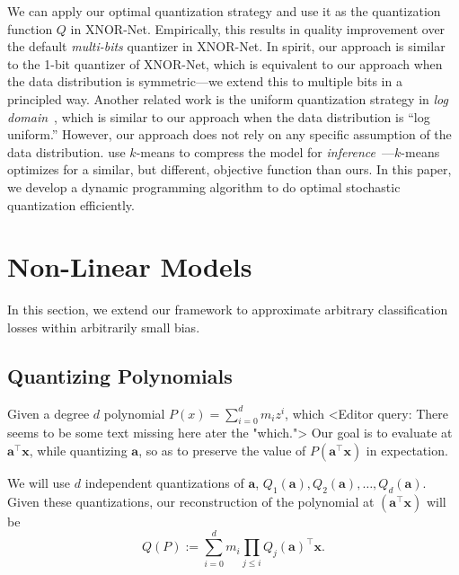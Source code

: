 \documentclass{article}
\renewcommand{\vec}[1]{\mathbf{#1}}
\begin{document}
We can apply our optimal quantization strategy 
and use it as the quantization function $Q$
in XNOR-Net. Empirically, this results in 
quality improvement
over the default {\em multi-bits} quantizer in XNOR-Net. 
In spirit, our approach is similar to the 1-bit quantizer of
XNOR-Net, which is equivalent to our approach when the data
distribution is symmetric---we extend this
to multiple bits in a principled way. Another related work
is the uniform quantization strategy 
in {\em log domain}~\cite{miyashita2016convolutional},
which is similar to our approach when the data distribution
is ``log uniform.'' However, our approach does not rely on
any specific assumption of the data distribution.
\citet{Han:2016:ICLR} use $k$-means to
compress the model for {\em inference}~---$k$-means
optimizes for a similar, but different, objective
function than ours. In this paper, we 
develop a dynamic
programming algorithm to do optimal stochastic quantization efficiently.



\vspace{-1em}
\section{Non-Linear Models}
\vspace{-0.5em}

In this section, we extend our framework to approximate arbitrary classification losses within arbitrarily small bias. 

\vspace{-0.5em}
\subsection{Quantizing Polynomials} 
\vspace{-0.5em}

Given a degree $d$ polynomial $P(x) = \sum_{i = 0}^{d} m_i z^i$, which <Editor query: There seems to be some text missing here ater the "which.">
Our goal is to evaluate at $\vec{a}^\top \vec{x}$, while quantizing $\vec{a}$, so as to preserve the value of $P( \vec{a}^\top \vec{x})$ in expectation. 

We will use $d$ independent quantizations of $\vec{a}$, $Q_1(\vec{a}), Q_2(\vec{a}), \ldots, Q_d(\vec{a})$. 
Given these quantizations, our reconstruction of the polynomial at $( \vec{a}^\top \vec{x})$ will be 
\vspace{-0.5em}
$$ Q(P) := \sum_{i = 0}^d m_i \prod_{j \leq i} Q_j(\vec{a})^\top \vec{x}.$$
\end{document}
